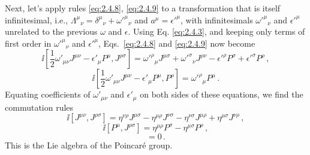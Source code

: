 Next, let's apply rules \eqref{eq:2.4.8}, \eqref{eq:2.4.9} to a transformation that is itself
infinitesimal, i.e., $\Lambda^\mu{}_{\nu}=\delta^\mu{}_{\nu}+\omega'^\mu{}_{\nu}$
and $a^\mu=\epsilon'^\mu$, with infinitesimals $\omega'^\mu{}_{\nu}$ and
$\epsilon'^\mu$ unrelated to the previous $\omega$ and $\epsilon$. Using Eq.
\eqref{eq:2.4.3}, and keeping only terms of first order in $\omega'^\mu{}_{\nu}$ and
$\epsilon'^\mu$, Eqs.~\eqref{eq:2.4.8} and \eqref{eq:2.4.9} now become
\begin{equation}
\ii\left[\frac12\omega'_{\mu\nu}J^{\mu\nu}-\epsilon'_\mu P^\mu,
J^{\rho\sigma}\right]
=\omega'^\rho{}_{\mu}J^{\mu\sigma}
+\omega'^\sigma{}_{\nu}J^{\rho\nu}
-\epsilon'^\rho P^\sigma+\epsilon'^\sigma P^\rho\,,
\tag{2.4.10}\label{eq:2.4.10}
\end{equation}
\begin{equation}
\ii\left[\frac12\omega'_{\mu\nu}J^{\mu\nu}-\epsilon'_\mu P^\mu,
P^\rho\right]
=\omega'^\rho{}_{\mu}P^\mu\,.
\tag{2.4.11}\label{eq:2.4.11}
\end{equation}
Equating coefficients of $\omega'_{\mu\nu}$ and $\epsilon'_\mu$ on both sides
of these equations, we find the commutation rules
\begin{equation}
\ii[J^{\mu\nu},J^{\rho\sigma}]
=\eta^{\nu\rho}J^{\mu\sigma}-\eta^{\mu\rho}J^{\nu\sigma}
-\eta^{\nu\sigma}J^{\mu\rho}+\eta^{\mu\sigma}J^{\nu\rho}\,,
\tag{2.4.12}\label{eq:2.4.12}
\end{equation}
\begin{equation}
\ii[P^\mu,J^{\rho\sigma}]
=\eta^{\mu\rho}P^\sigma-\eta^{\mu\sigma}P^\rho\,,
\tag{2.4.13}\label{eq:2.4.13}
\end{equation}
\begin{equation}
[P^\mu,P^\rho]=0\,.
\tag{2.4.14}\label{eq:2.4.14}
\end{equation}
This is the Lie algebra of the Poincar\'e group.

